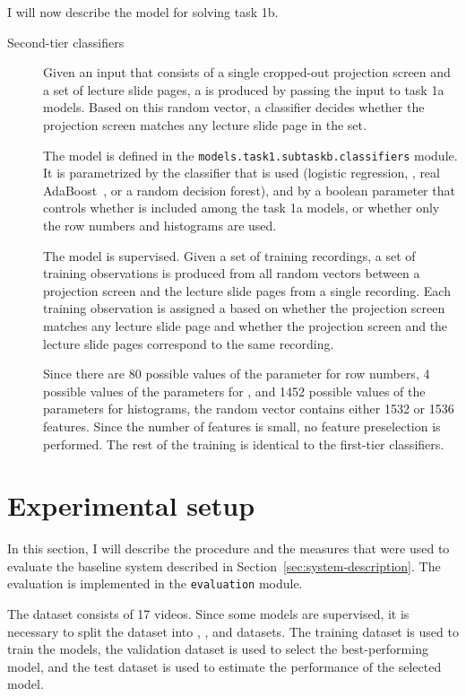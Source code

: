 I will now describe the model for solving task 1b.
\begin{description}
  \item[Second-tier classifiers]
    Given an input that consists of a single cropped-out projection screen and
    a set of lecture slide pages, a  is produced
    by passing the input to task 1a models. Based on this random vector, a
    classifier decides whether the projection screen matches any lecture slide
    page in the set.
    
    The model is defined in the \texttt{models.task1.subtaskb.classifiers}
    module. It is parametrized by the classifier that is used (logistic
    regression, , real AdaBoost~\cite{friedman2000additive}, or a
    random decision forest), and by a boolean parameter that controls whether
     is included among the task 1a models, or whether only the row
    numbers and histograms are used.

    The model is supervised. Given a set of training recordings, a set of
    training observations is produced from all random vectors between a
    projection screen and the lecture slide pages from a single recording. Each
    training observation is assigned a  based on whether the
    projection screen matches any lecture slide page and whether the projection
    screen and the lecture slide pages correspond to the same recording.

    Since there are 80 possible values of the parameter for row numbers, 4
    possible values of the parameters for , and 1452 possible values
    of the parameters for histograms, the random vector contains either 1532 or
    1536 features. Since the number of features is small, no feature
    preselection is performed. The rest of the training is identical to the
    first-tier classifiers.
\end{description}

\section{Experimental setup}
\label{sec:experimental-setup}
In this section, I will describe the procedure and the measures that were used
to evaluate the baseline system described in Section~\ref{sec:system-description}.
The evaluation is implemented in the \texttt{evaluation} module.

The dataset consists of 17 videos.
Since some models are supervised, it is necessary to split the dataset into
, , and  datasets. The training
dataset is used to train the models, the validation dataset is used to select
the best-performing model, and the test dataset is used to estimate the
performance of the selected model.
    
